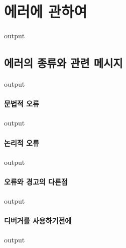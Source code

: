 \documentclass{report}
\begin{document}
\section{에러에 관하여}
\begin{Schunk}
\begin{Soutput}
output
\end{Soutput}
\end{Schunk}


\subsection{에러의 종류와 관련 메시지}

\begin{Schunk}
\begin{Soutput}
output
\end{Soutput}
\end{Schunk}

\paragraph{문법적 오류}
\begin{Schunk}
\begin{Soutput}
output
\end{Soutput}
\end{Schunk}

\paragraph{논리적 오류}
\begin{Schunk}
\begin{Soutput}
output
\end{Soutput}
\end{Schunk}

\paragraph{오류와 경고의 다른점}
\begin{Schunk}
\begin{Soutput}
output
\end{Soutput}
\end{Schunk}

\paragraph{디버거를 사용하기전에}
\begin{Schunk}
\begin{Soutput}
output
\end{Soutput}
\end{Schunk}
\end{document}
